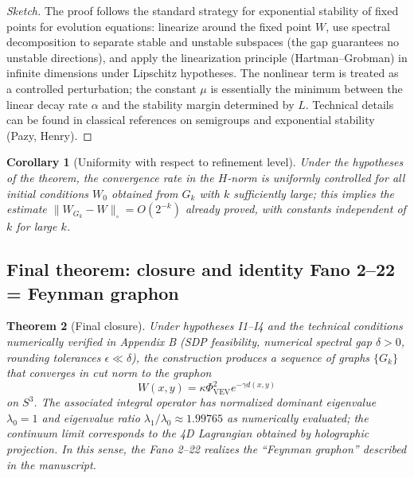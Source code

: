 \documentclass[12pt]{article}
\newtheorem{theorem}{Theorem}[section]
\newtheorem{corollary}[theorem]{Corollary}
\numberwithin{equation}{section}
\newcommand{\VEV}{\Phi_{\mathrm{VEV}}}
\begin{document}
\begin{proof}[Sketch]
The proof follows the standard strategy for exponential stability of fixed points for evolution equations: linearize around the fixed point \(W\), use spectral decomposition to separate stable and unstable subspaces (the gap guarantees no unstable directions), and apply the linearization principle (Hartman–Grobman) in infinite dimensions under Lipschitz hypotheses. The nonlinear term is treated as a controlled perturbation; the constant \(\mu\) is essentially the minimum between the linear decay rate \(\alpha\) and the stability margin determined by \(L\). Technical details can be found in classical references on semigroups and exponential stability (Pazy, Henry).
\end{proof}

\begin{corollary}[Uniformity with respect to refinement level]
Under the hypotheses of the theorem, the convergence rate in the \(H\)-norm is uniformly controlled for all initial conditions \(W_0\) obtained from \(G_k\) with \(k\) sufficiently large; this implies the estimate \(\|W_{G_k}-W\|_{\square}=O(2^{-k})\) already proved, with constants independent of \(k\) for large \(k\).
\end{corollary}

\subsection{Final theorem: closure and identity Fano 2--22 = Feynman graphon}

\begin{theorem}[Final closure]
\label{thm:final_closure}
Under hypotheses I1--I4 and the technical conditions numerically verified in Appendix B (SDP feasibility, numerical spectral gap \(\delta>0\), rounding tolerances \(\epsilon\ll\delta\)), the construction produces a sequence of graphs \(\{G_k\}\) that converges in cut norm to the graphon
\[
W(x,y)=\kappa\VEV^2 e^{-\gamma d(x,y)}
\]
on \(S^3\). The associated integral operator has normalized dominant eigenvalue \(\lambda_0=1\) and eigenvalue ratio \(\lambda_1/\lambda_0\approx 1.99765\) as numerically evaluated; the continuum limit corresponds to the 4D Lagrangian obtained by holographic projection. In this sense, the Fano 2--22 realizes the ``Feynman graphon'' described in the manuscript.
\end{theorem}
\end{document}
